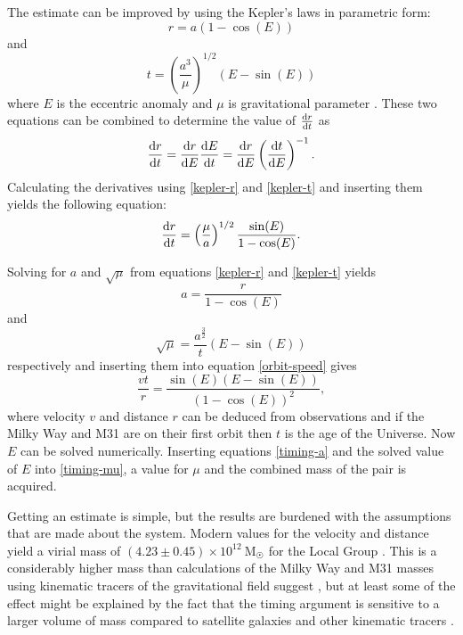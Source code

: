 \documentclass[english, twoside]{HYgradu}
\begin{document}
The estimate can be improved by using the Kepler's laws in parametric form:
\begin{equation}\label{kepler-r}
r = a(1-\cos(E))
\end{equation}
and
\begin{equation}\label{kepler-t}
t = \left(\frac{a^3}{\mu}\right)^{1/2}(E-\sin(E))
\end{equation}
where $E$ is the eccentric anomaly and $\mu$ is gravitational parameter \citep{li2008masses}. These two equations can be combined to determine the value of $\dv{r}{t}$ as
\begin{equation}
\dv{r}{t} = \dv{r}{E} \dv{E}{t} = \dv{r}{E} \left(\dv{t}{E}\right)^{-1}.
\end{equation}
Calculating the derivatives using \ref{kepler-r} and \ref{kepler-t} and inserting them yields the following equation:
\begin{equation}\label{orbit-speed}
\dv{r}{t} = \left(\frac{\mu}{a}\right)^{1/2}\frac{\sin(E)}{1 - \cos(E)}.
\end{equation}

Solving for $a$ and $\sqrt{\mu}$ from equations \ref{kepler-r} and \ref{kepler-t} yields
\begin{equation}\label{timing-a}
a = \frac{r}{1-\cos(E)}
\end{equation}
and
\begin{equation}\label{timing-mu}
\sqrt{\mu} = \frac{a^\frac{3}{2}}{t}(E - \sin(E))
\end{equation}
respectively and inserting them into equation \ref{orbit-speed} gives
\begin{equation}
\frac{vt}{r} = \frac{\sin (E) \left(E - \sin(E)\right)}{(1- \cos(E))^2},
\end{equation}
where velocity $v$ and distance $r$ can be deduced from observations and if the Milky Way and M31 are on their first orbit then $t$ is the age of the Universe. Now $E$ can be solved numerically. Inserting equations \ref{timing-a} and the solved value of $E$ into \ref{timing-mu}, a value for $\mu$ and the combined mass of the pair is acquired.

Getting an estimate is simple, but the results are burdened with the assumptions that are made about the system. Modern values for the velocity and distance yield a virial mass of $(4.23 \pm 0.45) \times 10^{12}~\mathrm{M_{\astrosun}}$ for the Local Group \citep{vandermarel2012m31}. This is a considerably higher mass than calculations of the Milky Way and M31 masses using kinematic tracers of the gravitational field suggest \citep{wang2015estimating}, but at least some of the effect might be explained by the fact that the timing argument is sensitive to a larger volume of mass compared to satellite galaxies and other kinematic tracers \citep{kroeker1991accuracy}.
\end{document}
